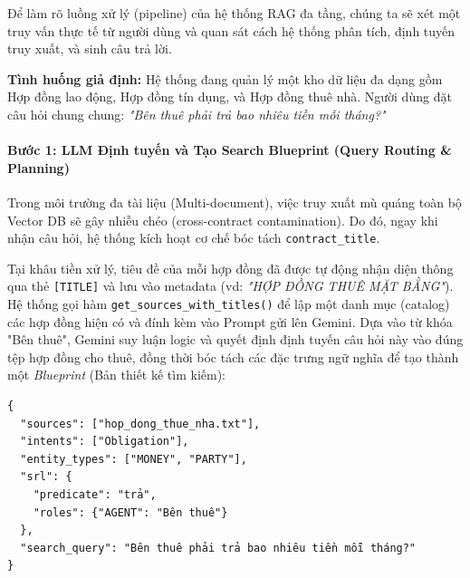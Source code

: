 Để làm rõ luồng xử lý (pipeline) của hệ thống RAG đa tầng, chúng ta sẽ xét một truy vấn thực tế từ người dùng và quan sát cách hệ thống phân tích, định tuyến truy xuất, và sinh câu trả lời.

\textbf{Tình huống giả định:} Hệ thống đang quản lý một kho dữ liệu đa dạng gồm Hợp đồng lao động, Hợp đồng tín dụng, và Hợp đồng thuê nhà. Người dùng đặt câu hỏi chung chung: \textit{"Bên thuê phải trả bao nhiêu tiền mỗi tháng?"}

\paragraph{Bước 1: LLM Định tuyến và Tạo Search Blueprint (Query Routing \& Planning)}
Trong môi trường đa tài liệu (Multi-document), việc truy xuất mù quáng toàn bộ Vector DB sẽ gây nhiễu chéo (cross-contract contamination). Do đó, ngay khi nhận câu hỏi, hệ thống kích hoạt cơ chế bóc tách \texttt{contract\_title}. 

Tại khâu tiền xử lý, tiêu đề của mỗi hợp đồng đã được tự động nhận diện thông qua thẻ \texttt{[TITLE]} và lưu vào metadata (vd: \textit{"HỢP ĐỒNG THUÊ MẶT BẰNG"}). Hệ thống gọi hàm \texttt{get\_sources\_with\_titles()} để lập một danh mục (catalog) các hợp đồng hiện có và đính kèm vào Prompt gửi lên Gemini. Dựa vào từ khóa "Bên thuê", Gemini suy luận logic và quyết định định tuyến câu hỏi này vào đúng tệp hợp đồng cho thuê, đồng thời bóc tách các đặc trưng ngữ nghĩa để tạo thành một \textit{Blueprint} (Bản thiết kế tìm kiếm):

\begin{verbatim}
{
  "sources": ["hop_dong_thue_nha.txt"],
  "intents": ["Obligation"], 
  "entity_types": ["MONEY", "PARTY"],
  "srl": {
    "predicate": "trả",
    "roles": {"AGENT": "Bên thuê"}
  },
  "search_query": "Bên thuê phải trả bao nhiêu tiền mỗi tháng?"
}
\end{verbatim}

